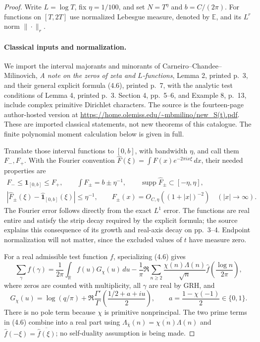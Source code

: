 \begin{proof}
Write $L=\log T$, fix $\eta=1/100$, and set
$N=T^\eta$ and $b=C/(2\pi)$. For functions on $[T,2T]$ use
normalized Lebesgue measure, denoted by $\mathbb E$, and its
$L^r$ norm $\|\cdot\|_r$.

\paragraph{Classical inputs and normalization.}
We import the interval majorants and minorants of
Carneiro--Chandee--Milinovich, \emph{A note on the zeros of zeta
and $L$-functions}, Lemma 2, printed p.~3, and their general
explicit formula (4.6), printed p.~7, with the analytic test
conditions of Lemma 4, printed p.~3. Section 4, pp.~5--6, and
Example 8, p.~13, include complex primitive Dirichlet characters.
The source is the fourteen-page author-hosted version at
\url{https://home.olemiss.edu/~mbmilino/new_S(t).pdf}.
These are imported classical statements, not new theorems of
this catalogue. The finite polynomial moment calculation below
is given in full.

Translate those interval functions to $[0,b]$, with bandwidth
$\eta$, and call them $F_-,F_+$. With the Fourier convention
$\widehat F(\xi)=\int F(x)e^{-2\pi ix\xi}\,dx$, their needed
properties are
\begin{gather*}
 F_-\le\mathbf1_{[0,b]}\le F_+,
 \qquad \int F_\pm=b\pm\eta^{-1},
 \qquad \operatorname{supp}\widehat F_\pm\subset[-\eta,\eta],\\
 \left|\widehat F_\pm(\xi)-\widehat{\mathbf1}_{[0,b]}(\xi)\right|
       \le\eta^{-1},\qquad
 F_\pm(x)=O_{C,\eta}((1+|x|)^{-2})\quad (|x|\longrightarrow\infty).
\end{gather*}
The Fourier error follows directly from the exact $L^1$ error.
The functions are real entire and satisfy the strip decay
required by the explicit formula; the source explains this
consequence of its growth and real-axis decay on pp.~3--4.
Endpoint normalization will not matter, since the excluded
values of $t$ have measure zero.

For a real admissible test function $f$, specializing (4.6) gives
\begin{equation}\label{eq:A042-direct-explicit}
 \sum_\gamma f(\gamma)
 =\frac1{2\pi}\int_{\mathbb R}f(u)G_\chi(u)\,du
  -\frac1\pi\Re\sum_{n\ge2}
       \frac{\chi(n)\Lambda(n)}{\sqrt n}
       \widehat f\left(\frac{\log n}{2\pi}\right),
\end{equation}
where zeros are counted with multiplicity, all $\gamma$ are real
by GRH, and
\[
 G_\chi(u)=\log(q/\pi)+
  \Re\frac{\Gamma'}{\Gamma}\left(\frac{1/2+a+iu}{2}\right),
 \qquad a=\frac{1-\chi(-1)}2\in\{0,1\}.
\]
There is no pole term because $\chi$ is primitive nonprincipal.
The two prime terms in (4.6) combine into a real part using
$\Lambda_{\bar\chi}(n)=\overline{\chi(n)}\Lambda(n)$ and
$\widehat f(-\xi)=\overline{\widehat f(\xi)}$; no self-duality
assumption is being made.


\end{proof}
